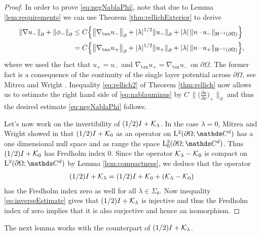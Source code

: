 \begin{proof}
  In order to prove \eqref{eq:negNablaPhi}, note that due to Lemma \ref{lem:requirements} we can use Theorem \ref{thm:rellichExterior} to derive
  \begin{align}
    \|\nabla u_-\|^{}_\partial + \|\phi_-\|^{}_\partial
    &\leq C \Big\{ \big\|\nabla_{\mathrm{tan}} u_- \big\|^{}_\partial + |\lambda|^{1/2} \| u_-\|^{}_\partial + |\lambda|\, \| n \cdot u_-\|_{\mathrm{H}^{-1}(\partial\Omega)} \Big\} \nonumber\\
    \label{eq:nablauminus}
    &= C \Big\{ \big\|\nabla_{\mathrm{tan}} u_+ \big\|^{}_\partial + |\lambda|^{1/2} \| u_+ \|^{}_\partial + |\lambda|\, \|n \cdot u_+ \|_{\mathrm{H}^{-1}(\partial\Omega)} \Big\},
  \end{align}
  where we used the fact that $u_+ = u_-$ and $\nabla_{\mathrm{tan}} u_+ = \nabla_{\mathrm{tan}} u_-$ on $\partial\Omega$. The former fact is a consequence of the continuity of the single layer potential across $\partial\Omega$, see Mitrea and Wright \cite[Prop. 4.7]{mitreaWright}.
  Inequality \eqref{eq:rellich2} of Theorem \ref{thm:rellich} now allows us to estimate the right hand side of \eqref{eq:nablauminus} by $C \,\|\big(\frac{\partial u}{\partial \nu} \big)_+ \|^{}_\partial$ and thus the desired estimate \eqref{eq:negNablaPhi} follows.

  Let's now work on the invertibility of $(1/2) I + \mathcal{K}_\lambda$. In the case $\lambda = 0$, Mitrea and Wright showed in \cite[Eq. (5.166)]{mitreaWright} that $(1/2) I + \mathcal{K}_0$ as an operator on $\Ell^2(\partial\Omega; \C^d)$ has a one dimensional null space and as range the space $\Ell_0^2(\partial\Omega; \C^d)$.
  Thus $(1/2) I + \mathcal{K}_0$ has Fredholm index $0$.
  Since the operator $\mathcal{K}_\lambda - \mathcal{K}_0$ is compact on $\Ell^2(\partial\Omega; \C^d)$ by Lemma \ref{lem:compactness}, we deduce that the operator
  \begin{align*}
    (1/2)I + \mathcal{K}_\lambda = (1/2)I + \mathcal{K}_0 + (\mathcal{K}_\lambda - \mathcal{K}_0)
  \end{align*}
  has the Fredholm index zero as well for all $\lambda \in \Sigma_\theta$.
  Now inequality \eqref{eq:inverseEstimate} gives that $(1/2)I + \mathcal{K}_\lambda$ is injective and thus the Fredholm index of zero implies that it is also surjective and hence an isomorphism.
\end{proof}

The next lemma works with the counterpart of $(1/2)I + \mathcal{K}_\lambda$.

